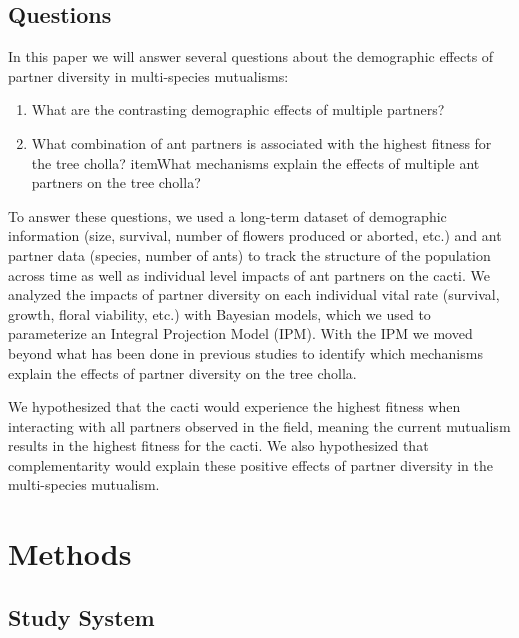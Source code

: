 \documentclass[12pt,a4paper]{article}
\begin{document}
\subsection{Questions}
In this paper we will answer several questions about the demographic effects of partner diversity in multi-species mutualisms:
\begin{enumerate}
  \item{What are the contrasting demographic effects of multiple partners?}
  \item{What combination of ant partners is associated with the highest fitness for the tree cholla?}
  item{What mechanisms explain the effects of multiple ant partners on the tree cholla?}
\end{enumerate}

To answer these questions, we used a long-term dataset of demographic information (size, survival, number of flowers produced or aborted, etc.) and ant partner data (species, number of ants) to track the structure of the population across time as well as individual level impacts of ant partners on the cacti. 
We analyzed the impacts of partner diversity on each individual vital rate (survival, growth, floral viability, etc.) with Bayesian models, which we used to parameterize an Integral Projection Model (IPM).
With the IPM we moved beyond what has been done in previous studies\cite{Palmer2010} to identify which mechanisms explain the effects of partner diversity on the tree cholla. 


We hypothesized that the cacti would experience the highest fitness when interacting with all partners observed in the field, meaning the current mutualism results in the highest fitness for the cacti.
We also hypothesized that complementarity would explain these positive effects of partner diversity in the multi-species mutualism.


\section*{Methods}
\subsection*{Study System}
\end{document}
